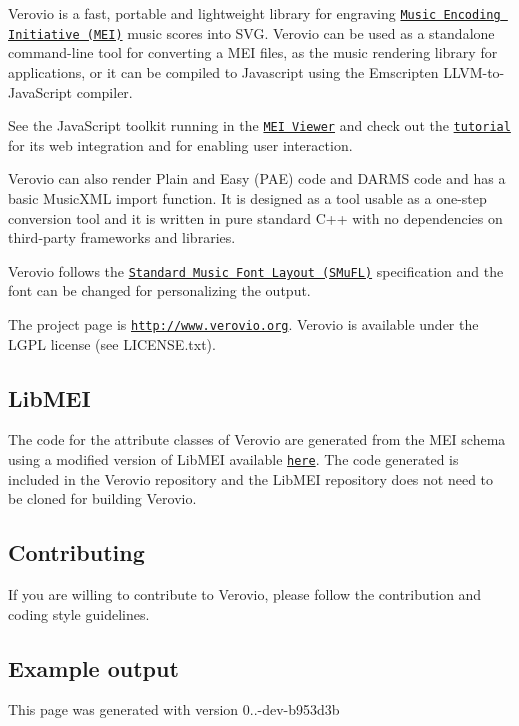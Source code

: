 Verovio is a fast, portable and lightweight library for engraving \href{http://www.music-encoding.org}{\tt Music Encoding Initiative (M\+EI)} music scores into S\+VG. Verovio can be used as a standalone command-\/line tool for converting a M\+EI files, as the music rendering library for applications, or it can be compiled to Javascript using the Emscripten L\+L\+V\+M-\/to-\/\+Java\+Script compiler.

See the Java\+Script toolkit running in the \href{http://www.verovio.org/mei-viewer.xhtml}{\tt M\+EI Viewer} and check out the \href{http://www.verovio.org/tutorial.xhtml}{\tt tutorial} for its web integration and for enabling user interaction.



Verovio can also render Plain and Easy (P\+AE) code and D\+A\+R\+MS code and has a basic Music\+X\+ML import function. It is designed as a tool usable as a one-\/step conversion tool and it is written in pure standard C++ with no dependencies on third-\/party frameworks and libraries.

Verovio follows the \href{http://www.smufl.org}{\tt Standard Music Font Layout (S\+Mu\+FL)} specification and the font can be changed for personalizing the output.

The project page is \href{http://www.verovio.org}{\tt http\+://www.\+verovio.\+org}. Verovio is available under the L\+G\+PL license (see L\+I\+C\+E\+N\+S\+E.\+txt).

\subsection*{Lib\+M\+EI }

The code for the attribute classes of Verovio are generated from the M\+EI schema using a modified version of Lib\+M\+EI available \href{https://github.com/rism-ch/libmei}{\tt here}. The code generated is included in the Verovio repository and the Lib\+M\+EI repository does not need to be cloned for building Verovio.

\subsection*{Contributing }

If you are willing to contribute to Verovio, please follow the contribution and coding style guidelines.

\subsection*{Example output }

This page was generated with version 0..-\/dev-\/b953d3b

 